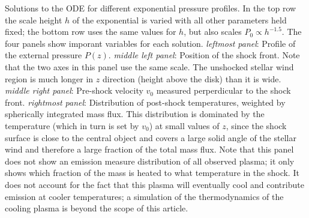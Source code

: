 \label{fig:p_ext}
Solutions to the ODE for different exponential pressure profiles. In the top row the scale height $h$ of the exponential is varied with all other parameters held fixed; the bottom row uses the same values for $h$, but also scales $P_0\propto h^{-1.5}$.
The four panels show imporant variables for each solution. 
\emph{leftmost panel}: Profile of the external pressure $P(z)$. 
\emph{middle left panel}: Position of the shock front. Note that the two axes in this panel use the same scale. The unshocked stellar wind region is much longer in $z$ direction (height above the disk) than it is wide. 
\emph{middle right panel}: Pre-shock velocity $v_0$ measured perperdicular to the shock front. 
\emph{rightmost panel}: Distribution of post-shock temperatures, weighted by spherically integrated mass flux. This distribution is dominated by the temperature (which in turn is set by $v_0$) at small values of $z$, since the shock surface is close to the central object and covers a large solid angle of the stellar wind and therefore a large fraction of the total mass flux. Note that this panel does not show an emission measure distribution of all observed plasma; it only shows which fraction of the mass is heated to what temperature in the shock. It does not account for the fact that this plasma will eventually cool and contribute emission at cooler temperatures; a simulation of the thermodynamics of the cooling plasma is beyond the scope of this article.